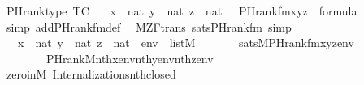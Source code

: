 \begin{isabellebody}
\ PHrank{\isacharunderscore}{\kern0pt}type\ {\isacharbrackleft}{\kern0pt}TC{\isacharbrackright}{\kern0pt}{\isacharcolon}{\kern0pt}\isanewline
\ \ {\isachardoublequoteopen}{\isasymlbrakk}\ x\ {\isasymin}\ nat{\isacharsemicolon}{\kern0pt}\ y\ {\isasymin}\ nat{\isacharsemicolon}{\kern0pt}\ z\ {\isasymin}\ nat\ {\isasymrbrakk}\ {\isasymLongrightarrow}\ PHrank{\isacharunderscore}{\kern0pt}fm{\isacharparenleft}{\kern0pt}x{\isacharcomma}{\kern0pt}y{\isacharcomma}{\kern0pt}z{\isacharparenright}{\kern0pt}\ {\isasymin}\ formula{\isachardoublequoteclose}\isanewline
%
\isadelimproof
\ \ %
\endisadelimproof
%
\isatagproof
{}\isamarkupfalse%
\ {\isacharparenleft}{\kern0pt}simp\ add{\isacharcolon}{\kern0pt}PHrank{\isacharunderscore}{\kern0pt}fm{\isacharunderscore}{\kern0pt}def{\isacharparenright}{\kern0pt}%
\endisatagproof
{\isafoldproof}%
%
\isadelimproof
\isanewline
%
\endisadelimproof
\isanewline
\isanewline
{}\isamarkupfalse%
\ {\isacharparenleft}{\kern0pt}\ M{\isacharunderscore}{\kern0pt}ZF{\isacharunderscore}{\kern0pt}trans{\isacharparenright}{\kern0pt}\ sats{\isacharunderscore}{\kern0pt}PHrank{\isacharunderscore}{\kern0pt}fm\ {\isacharbrackleft}{\kern0pt}simp{\isacharbrackright}{\kern0pt}{\isacharcolon}{\kern0pt}\isanewline
\ \ {\isachardoublequoteopen}{\isasymlbrakk}\ x\ {\isasymin}\ nat{\isacharsemicolon}{\kern0pt}\ y\ {\isasymin}\ nat{\isacharsemicolon}{\kern0pt}\ z\ {\isasymin}\ nat{\isacharsemicolon}{\kern0pt}\ \ env\ {\isasymin}\ list{\isacharparenleft}{\kern0pt}M{\isacharparenright}{\kern0pt}\ {\isasymrbrakk}\ \isanewline
\ \ \ \ {\isasymLongrightarrow}\ sats{\isacharparenleft}{\kern0pt}M{\isacharcomma}{\kern0pt}PHrank{\isacharunderscore}{\kern0pt}fm{\isacharparenleft}{\kern0pt}x{\isacharcomma}{\kern0pt}y{\isacharcomma}{\kern0pt}z{\isacharparenright}{\kern0pt}{\isacharcomma}{\kern0pt}env{\isacharparenright}{\kern0pt}\ {\isasymlongleftrightarrow}\isanewline
\ \ \ \ \ \ \ \ PHrank{\isacharparenleft}{\kern0pt}{\isacharhash}{\kern0pt}{\isacharhash}{\kern0pt}M{\isacharcomma}{\kern0pt}nth{\isacharparenleft}{\kern0pt}x{\isacharcomma}{\kern0pt}env{\isacharparenright}{\kern0pt}{\isacharcomma}{\kern0pt}nth{\isacharparenleft}{\kern0pt}y{\isacharcomma}{\kern0pt}env{\isacharparenright}{\kern0pt}{\isacharcomma}{\kern0pt}nth{\isacharparenleft}{\kern0pt}z{\isacharcomma}{\kern0pt}env{\isacharparenright}{\kern0pt}{\isacharparenright}{\kern0pt}{\isachardoublequoteclose}\isanewline
%
\isadelimproof
\ \ %
\endisadelimproof
%
\isatagproof
{}\isamarkupfalse%
\ zero{\isacharunderscore}{\kern0pt}in{\isacharunderscore}{\kern0pt}M\ Internalizations{\isachardot}{\kern0pt}nth{\isacharunderscore}{\kern0pt}closed\ \isamarkupfalse%

\end{isabellebody}
